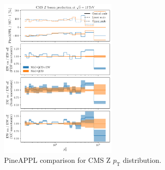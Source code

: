 \begin{figure}[!t]
    \centering
    \includegraphics[width=0.5\textwidth]{figures/pineappl_CMS_Z_13_TEV}
    \caption{PineAPPL comparison for CMS Z $p_\mathrm{T}$ distribution.}
    \label{fig:cmsZ13TeV}
\end{figure}


